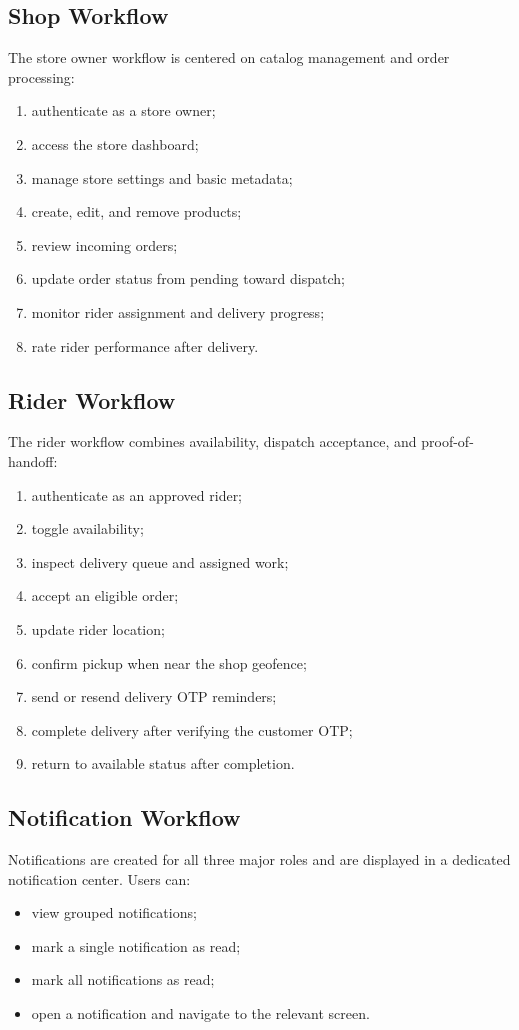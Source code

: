 \documentclass[12pt,a4paper]{article}
\begin{document}
\subsection{Shop Workflow}
The store owner workflow is centered on catalog management and order processing:
\begin{enumerate}[leftmargin=1.5em]
    \item authenticate as a store owner;
    \item access the store dashboard;
    \item manage store settings and basic metadata;
    \item create, edit, and remove products;
    \item review incoming orders;
    \item update order status from pending toward dispatch;
    \item monitor rider assignment and delivery progress;
    \item rate rider performance after delivery.
\end{enumerate}

\subsection{Rider Workflow}
The rider workflow combines availability, dispatch acceptance, and proof-of-handoff:
\begin{enumerate}[leftmargin=1.5em]
    \item authenticate as an approved rider;
    \item toggle availability;
    \item inspect delivery queue and assigned work;
    \item accept an eligible order;
    \item update rider location;
    \item confirm pickup when near the shop geofence;
    \item send or resend delivery OTP reminders;
    \item complete delivery after verifying the customer OTP;
    \item return to available status after completion.
\end{enumerate}

\subsection{Notification Workflow}
Notifications are created for all three major roles and are displayed in a dedicated notification center. Users can:
\begin{itemize}[leftmargin=1.5em]
    \item view grouped notifications;
    \item mark a single notification as read;
    \item mark all notifications as read;
    \item open a notification and navigate to the relevant screen.
\end{itemize}
\end{document}
